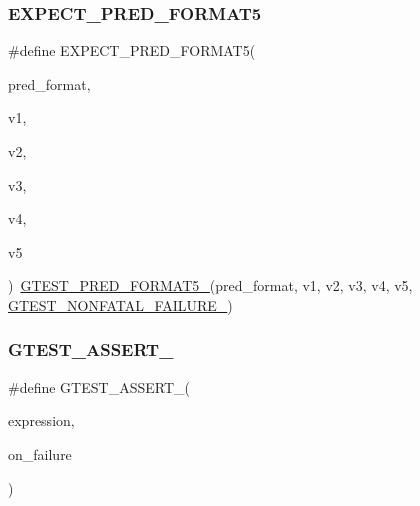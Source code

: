 \mbox{\label{_obj__test_2lib_2googletest-master_2googletest_2include_2gtest_2gtest__pred__impl_8h_a74beddf9661e4460f9969fe211b9e80e}} 
\subsubsection{\texorpdfstring{EXPECT\_PRED\_FORMAT5}{EXPECT\_PRED\_FORMAT5}}
{\footnotesize\ttfamily \#define E\+X\+P\+E\+C\+T\+\_\+\+P\+R\+E\+D\+\_\+\+F\+O\+R\+M\+A\+T5(\begin{DoxyParamCaption}\item[{}]{pred\+\_\+format,  }\item[{}]{v1,  }\item[{}]{v2,  }\item[{}]{v3,  }\item[{}]{v4,  }\item[{}]{v5 }\end{DoxyParamCaption})~\mbox{\hyperlink{_obj__test_2lib_2googletest-release-1_88_81_2googletest_2include_2gtest_2gtest__pred__impl_8h_a107623ee191560f703a3fdc983803c8e}{G\+T\+E\+S\+T\+\_\+\+P\+R\+E\+D\+\_\+\+F\+O\+R\+M\+A\+T5\+\_\+}}(pred\+\_\+format, v1, v2, v3, v4, v5, \mbox{\hyperlink{_obj__test_2lib_2googletest-release-1_88_81_2googletest_2include_2gtest_2internal_2gtest-internal_8h_a6cb7482cfa03661a91c698eb5895f642}{G\+T\+E\+S\+T\+\_\+\+N\+O\+N\+F\+A\+T\+A\+L\+\_\+\+F\+A\+I\+L\+U\+R\+E\+\_\+}})}

\mbox{\label{_obj__test_2lib_2googletest-master_2googletest_2include_2gtest_2gtest__pred__impl_8h_a8c09939dd67f1bb5b68c9f6a44ea75db}} 
\subsubsection{\texorpdfstring{GTEST\_ASSERT\_}{GTEST\_ASSERT\_}}
{\footnotesize\ttfamily \#define G\+T\+E\+S\+T\+\_\+\+A\+S\+S\+E\+R\+T\+\_\+(\begin{DoxyParamCaption}\item[{}]{expression,  }\item[{}]{on\+\_\+failure }\end{DoxyParamCaption})}


